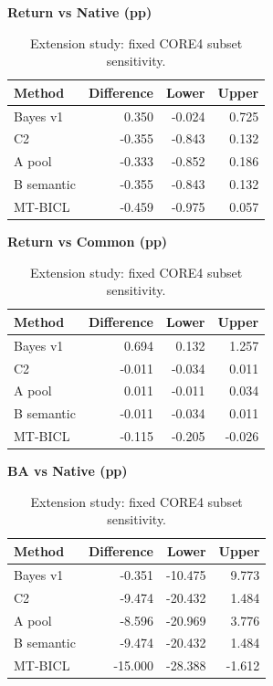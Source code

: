 \begin{table}[!htb]
\centering\small
\setlength{\tabcolsep}{3pt}
\renewcommand{\arraystretch}{1.12}
\caption{Extension study: fixed CORE4 subset sensitivity.}
\label{tab:u09-sensitivity-core4}
\begin{minipage}[t]{0.48\textwidth}
\centering
\textbf{Return vs Native (pp)}\par\smallskip
\begin{tabular}{lrrr}
\hline
Method & Difference & Lower & Upper \\
\hline
Bayes v1 & 0.350 & -0.024 & 0.725 \\
C2 & -0.355 & -0.843 & 0.132 \\
A pool & -0.333 & -0.852 & 0.186 \\
B semantic & -0.355 & -0.843 & 0.132 \\
MT-BICL & -0.459 & -0.975 & 0.057 \\
\hline
\end{tabular}
\end{minipage}\hfill
\begin{minipage}[t]{0.48\textwidth}
\centering
\textbf{Return vs Common (pp)}\par\smallskip
\begin{tabular}{lrrr}
\hline
Method & Difference & Lower & Upper \\
\hline
Bayes v1 & 0.694 & 0.132 & 1.257 \\
C2 & -0.011 & -0.034 & 0.011 \\
A pool & 0.011 & -0.011 & 0.034 \\
B semantic & -0.011 & -0.034 & 0.011 \\
MT-BICL & -0.115 & -0.205 & -0.026 \\
\hline
\end{tabular}
\end{minipage}\par\medskip
\begin{minipage}[t]{0.48\textwidth}
\centering
\textbf{BA vs Native (pp)}\par\smallskip
\begin{tabular}{lrrr}
\hline
Method & Difference & Lower & Upper \\
\hline
Bayes v1 & -0.351 & -10.475 & 9.773 \\
C2 & -9.474 & -20.432 & 1.484 \\
A pool & -8.596 & -20.969 & 3.776 \\
B semantic & -9.474 & -20.432 & 1.484 \\
MT-BICL & -15.000 & -28.388 & -1.612 \\

\end{tabular}
\end{minipage}
\end{table}

